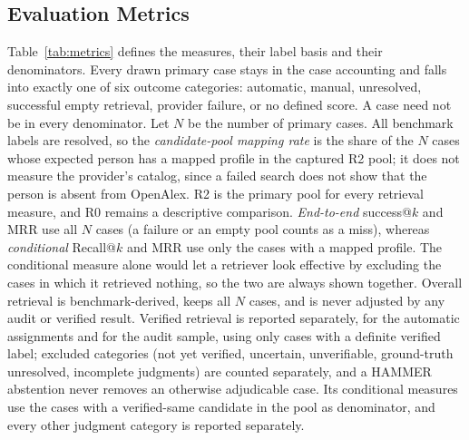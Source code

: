\subsection{Evaluation Metrics}
\label{sec:metrics}
Table~\ref{tab:metrics} defines the measures, their label basis and their denominators. Every drawn primary case stays in the case accounting and falls into exactly one of six outcome categories: automatic, manual, unresolved, successful empty retrieval, provider failure, or no defined score. A case need not be in every denominator. Let $N$ be the number of primary cases. All benchmark labels are resolved, so the \emph{candidate-pool mapping rate} is the share of the $N$ cases whose expected person has a mapped profile in the captured R2 pool; it does not measure the provider's catalog, since a failed search does not show that the person is absent from OpenAlex. R2 is the primary pool for every retrieval measure, and R0 remains a descriptive comparison. \emph{End-to-end} success@$k$ and MRR use all $N$ cases (a failure or an empty pool counts as a miss), whereas \emph{conditional} Recall@$k$ and MRR use only the cases with a mapped profile. The conditional measure alone would let a retriever look effective by excluding the cases in which it retrieved nothing, so the two are always shown together. Overall retrieval is benchmark-derived, keeps all $N$ cases, and is never adjusted by any audit or verified result. Verified retrieval is reported separately, for the automatic assignments and for the audit sample, using only cases with a definite verified label; excluded categories (not yet verified, uncertain, unverifiable, ground-truth unresolved, incomplete judgments) are counted separately, and a HAMMER abstention never removes an otherwise adjudicable case. Its conditional measures use the cases with a verified-same candidate in the pool as denominator, and every other judgment category is reported separately.

